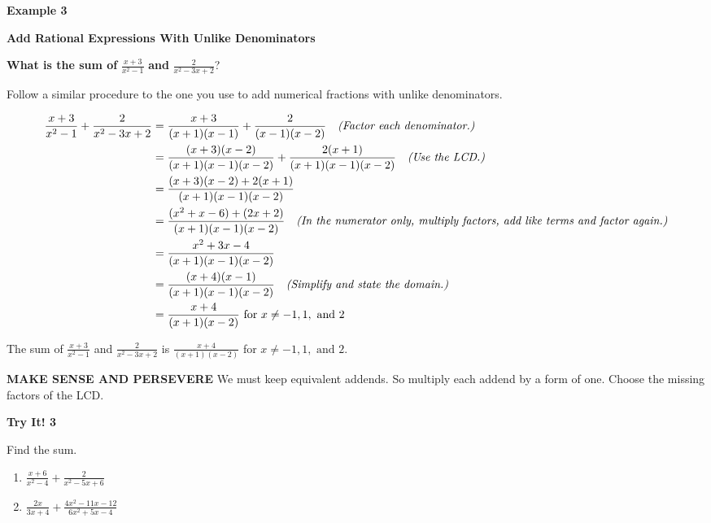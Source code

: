 \documentclass{article}
\newenvironment{concept-box}{}{}
\newenvironment{example}[1]{\textbf{Example #1}\par}{\par}
\newenvironment{tryit}[1]{\textbf{Try It! #1}\par}{\par}
\begin{document}
\begin{example}{3}
\textbf{Add Rational Expressions With Unlike Denominators}

\textbf{What is the sum of} $\frac{x + 3}{x^2 - 1}$ \textbf{and} $\frac{2}{x^2 - 3x + 2}$?

Follow a similar procedure to the one you use to add numerical fractions with unlike denominators.

\begin{align*}
\frac{x + 3}{x^2 - 1} + \frac{2}{x^2 - 3x + 2} &= \frac{x + 3}{(x + 1)(x - 1)} + \frac{2}{(x - 1)(x - 2)} \quad \text{\textit{(Factor each denominator.)}} \\
&= \frac{(x + 3)(x - 2)}{(x + 1)(x - 1)(x - 2)} + \frac{2(x + 1)}{(x + 1)(x - 1)(x - 2)} \quad \text{\textit{(Use the LCD.)}} \\
&= \frac{(x + 3)(x - 2) + 2(x + 1)}{(x + 1)(x - 1)(x - 2)} \\
&= \frac{(x^2 + x - 6) + (2x + 2)}{(x + 1)(x - 1)(x - 2)} \quad \text{\textit{(In the numerator only, multiply factors, add like terms and factor again.)}} \\
&= \frac{x^2 + 3x - 4}{(x + 1)(x - 1)(x - 2)} \\
&= \frac{(x + 4)(x - 1)}{(x + 1)(x - 1)(x - 2)} \quad \text{\textit{(Simplify and state the domain.)}} \\
&= \frac{x + 4}{(x + 1)(x - 2)} \text{ for } x \neq -1, 1, \text{ and } 2
\end{align*}

The sum of $\frac{x + 3}{x^2 - 1}$ and $\frac{2}{x^2 - 3x + 2}$ is $\frac{x + 4}{(x + 1)(x - 2)}$ for $x \neq -1, 1, \text{ and } 2$.
\end{example}

\begin{concept-box}
\textbf{MAKE SENSE AND PERSEVERE}
We must keep equivalent addends. So multiply each addend by a form of one. Choose the missing factors of the LCD.
\end{concept-box}

\begin{tryit}{3}
Find the sum.
\begin{enumerate}
    \item[\textbf{a.}] $\frac{x + 6}{x^2 - 4} + \frac{2}{x^2 - 5x + 6}$
    \item[\textbf{b.}] $\frac{2x}{3x + 4} + \frac{4x^2 - 11x - 12}{6x^2 + 5x - 4}$
\end{enumerate}
\end{tryit}
\end{document}
